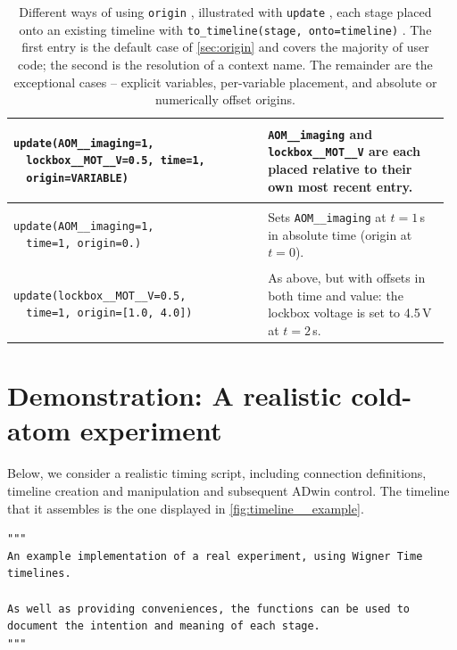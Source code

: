 \documentclass{SciPost}
\newcommand{\mintedsmall}{\fontsize{4pt}{4.8pt}\selectfont}
\newcommand{\python}[1]{%
  \texttt{#1}%
}
\newenvironment{pythonTable}
  {\VerbatimEnvironment
   \begin{minipage}[t]{\linewidth}%
   \begin{verbatim}}
  {\end{verbatim}%
   \end{minipage}}
\begin{document}
\begin{appendix}
\begin{table}
\begin{tabular}{p{0.57\linewidth}|p{0.4\linewidth}}
    \begin{pythonTable}
update(AOM__imaging=1,
  lockbox__MOT__V=0.5, time=1,
  origin=VARIABLE)
    \end{pythonTable}
    & \small\python{AOM__imaging} and \python{lockbox__MOT__V} are each placed relative to their own most recent entry.\\\hline

    \begin{pythonTable}
update(AOM__imaging=1,
  time=1, origin=0.)
    \end{pythonTable}
    & Sets \python{AOM__imaging} at $t=1$\,s in absolute time (origin at $t=0$).\\\hline

    \begin{pythonTable}
update(lockbox__MOT__V=0.5,
  time=1, origin=[1.0, 4.0])
    \end{pythonTable}
    & \small As above, but with offsets in both time and value: the lockbox voltage is set to 4.5\,V at $t=2$\,s.\\\hline

    \end{tabular}
    \caption{\label{tab:originSpecs} Different ways of using \python{origin}, illustrated with \python{update}, each stage placed onto an existing timeline with \python{to_timeline(stage, onto=timeline)}. The first entry is the default case of \cref{sec:origin} and covers the majority of user code; the second is the resolution of a context name. The remainder are the exceptional cases – explicit variables, per-variable placement, and absolute or numerically offset origins.}
\end{table}
 
 
\section{Demonstration: A realistic cold-atom experiment}
\label{sec:demonstration}
Below, we consider a realistic timing script, including connection definitions, timeline creation and manipulation and subsequent ADwin control. The timeline that it assembles is the one displayed in \cref{fig:timeline__example}.
 
\begin{verbatim}
"""
An example implementation of a real experiment, using Wigner Time timelines.
 
As well as providing conveniences, the functions can be used to document the intention and meaning of each stage.
"""
 

\end{verbatim}
\end{appendix}
\end{document}
